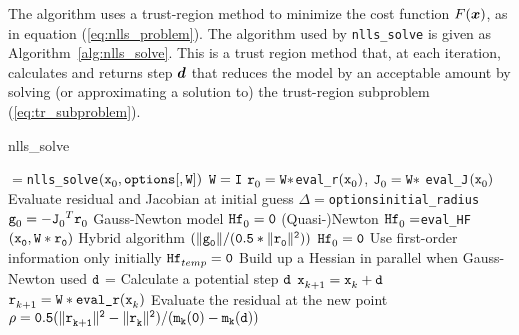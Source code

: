 
The algorithm uses a trust-region method to minimize the cost function
$F(\vx)$, as in equation (\ref{eq:nlls_problem}).  The algorithm used by \texttt{nlls\_solve} is given as Algorithm~\ref{alg:nlls_solve}.  This is a trust region method that, at each iteration, calculates and returns step $\vd$ that reduces the model by an acceptable amount by solving (or approximating a solution to) the trust-region subproblem (\ref{eq:tr_subproblem}). 

\begin{algorithm}
\caption{nlls\_solve}
\label{alg:nlls_solve}
  \begin{algorithmic}[1]
    $=${\tt nlls\_solve}$(\iter[0]{\tx},\text{\tt options}{\tt[,W]})$
    \State ${\tt W=I}$
    \EndIf
    \State $\iter[0]{\tr} =  {\tt W * }${\tt eval\_r}$(\iter[0]{\tx})$, $\iter[0]{\tJ} = {\tt W *}$ {\tt eval\_J}$(\iter[0]{\tx})$    
    \Comment Evaluate residual and Jacobian at initial guess
    \State $\Delta = ${\tt options\ct initial\_radius}
    \State $ \iter[0]{\tg} = - {\iter[0]{\tJ}}^T\iter[0]{\tr}$
    \Comment Gauss-Newton model 
    \State $\iter[0]{\thess} = {\tt 0}$
    \Comment (Quasi-)Newton 
    \State $\iter[0]{\thess} = ${\tt eval\_HF}${\tt (\iter[0]{\tx},W * \iter[0]{\tr})}$
    \Comment Hybrid algorithm
    ${\tt (\| \iter[0]{\tg} \| / (0.5 * \|\iter[0]{\tr}\|^2) )}$
    \State $\iter[0]{\thess} = {\tt 0}$
    \Comment Use first-order information only initially
    \State ${\iter[temp]{\thess}} = {\tt 0}$
    \Comment Build up a Hessian in parallel when Gauss-Newton used
    \EndIf
        \State ${\td}$ = 
        \Comment Calculate a potential step $\td$
        \State $\iter[k+1]{\tx} = \iter[k]{\tx} + \td$
        \State $\iter[k+1]{\tr} = {\tt W * \text{\tt eval\_r}}(\iter[k]{\tx})$
        \Comment Evaluate the residual at the new point
        \State $\rho = \tt 0.5 (\| \iter[k+1]{\tr} \|^2 - \| \iter[k]{\tr}\|^2)/(m_k(0) - m_k(\td)) $ 

\end{algorithmic}
\end{algorithm}
